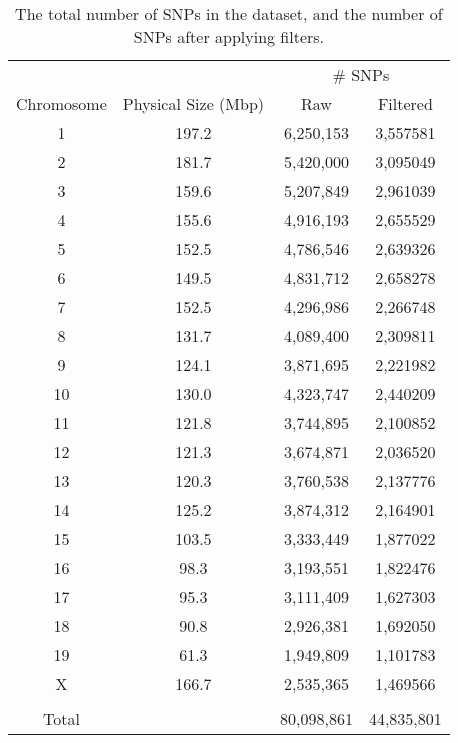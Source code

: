 
\begin{table}
\caption{The total number of SNPs in the dataset, and the number of SNPs after applying filters.}
\begin{tabular} {c c c c} \\ [ 0.5ex ] \hline
 &  & \multicolumn{2}{c}{\# SNPs} \\
Chromosome & Physical Size (Mbp) & Raw & Filtered \\ \hline
1 & 197.2 & 6,250,153 & 3,557581 \\
2 & 181.7 & 5,420,000 & 3,095049 \\
3 & 159.6 & 5,207,849 & 2,961039 \\ 
4 & 155.6 & 4,916,193 & 2,655529 \\
5 & 152.5 & 4,786,546 & 2,639326 \\
6 & 149.5 & 4,831,712 & 2,658278 \\ 
7 & 152.5 & 4,296,986 & 2,266748 \\
8 & 131.7 & 4,089,400 & 2,309811 \\
9 & 124.1 & 3,871,695 & 2,221982 \\ 
10 & 130.0 & 4,323,747 & 2,440209 \\ 
11 & 121.8 & 3,744,895 & 2,100852 \\
12 & 121.3 & 3,674,871 & 2,036520 \\
13 & 120.3 & 3,760,538 & 2,137776 \\
14 & 125.2 & 3,874,312 & 2,164901 \\ 
15 & 103.5 & 3,333,449 & 1,877022\\ 
16 & 98.3 & 3,193,551 & 1,822476 \\
17 & 95.3 & 3,111,409 & 1,627303 \\
18 & 90.8 & 2,926,381 & 1,692050 \\
19 & 61.3 & 1,949,809 & 1,101783 \\
X & 166.7 & 2,535,365 & 1,469566 \\
 &  &  &  \\
Total &  & 80,098,861 & 44,835,801 \\ \hline



\end{tabular}
\end{table}
